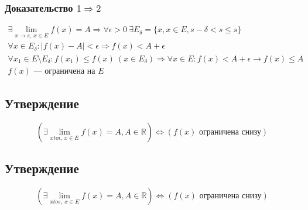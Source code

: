 \documentclass{article}
\begin{document}
\subsubsection{Доказательство $1 \Rightarrow 2$}
\begin{gather*}
    \exists \lim_{x \to s, ~ x \in E} f(x) = A \Rightarrow
    \forall \epsilon > 0 ~ \exists E_{\delta} = \{x, x \in E, s - \delta < s \le s\} \\
    \forall x \in E_{\delta}: |f(x) - A| < \epsilon \Rightarrow f(x) < A + \epsilon \\
    \forall x_1 \in E \setminus E_{\delta}: f(x_1) \le f(x) ~ (x \in E_{\delta}) \Rightarrow
    \forall x \in E: f(x) < A + \epsilon \rightarrow f(x) \le A \\
    f(x) \text{ --- ограничена на } E
\end{gather*}



\subsection{Утверждение}
\[
    \left( \exists \lim_{x to i, ~ x \in E} f(x) = A, A \in \mathbb{R} \right) \Leftrightarrow
    \left( f(x) \text{ ограничена снизу}\right)
\]


\subsection{Утверждение}
\[
    \left( \exists \lim_{x to s, ~ x \in E} f(x) = A, A \in \mathbb{R} \right) \Leftrightarrow
    \left( f(x) \text{ ограничена снизу}\right)
\]
\end{document}
